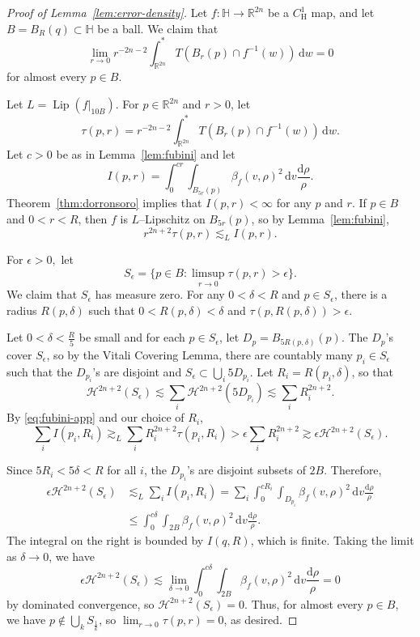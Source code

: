 \documentclass[12pt,reqno]{amsart}
\newcommand{\cH}{\mathcal{H}}
\DeclareMathOperator{\Lip}{Lip}
\newcommand{\HH}{\mathbb{H}}
\newcommand{\R}{\mathbb{R}}
\newcommand{\ud}[0]{\,\mathrm{d}}
\newcommand{\from}{\colon}
\theoremstyle{remark}
\newcommand{\0}{\mathbf{0}}
\renewcommand{\1}{\mathbf 1}
\begin{document}
\begin{proof}[Proof of Lemma~\ref{lem:error-density}]
  Let $f\from \HH \to \R^{2n}$ be a $C^1_{\mathrm{H}}$ map, and let $B=B_R(q) \subset \HH$ be a ball. We claim that
  \begin{equation}\label{eq:error-density-conclusion}
    \lim_{r\to 0} r^{-2n-2}\int^*_{\R^{2n}} T(B_r(p) \cap f^{-1}(w)) \ud w = 0
  \end{equation}
  for almost every $p \in B$.

  Let $L = \Lip(f|_{10B})$. 
  For $p\in \R^{2n}$ and $r>0$, let
  $$\tau(p, r) = r^{-2n-2}\int^*_{\R^{2n}} T(B_r(p) \cap f^{-1}(w)) \ud w.$$
  Let $c>0$ be as in Lemma~\ref{lem:fubini} and let 
  $$I(p,r) = \int_0^{cr} \int_{B_{5r}(p)}\beta_f(v, \rho)^2 \ud v \frac{\mathrm d\rho}{\rho}.$$
  Theorem~\ref{thm:dorronsoro} implies that $I(p,r) < \infty$ for any $p$ and $r$. If $p\in B$ and $0<r<R$, then $f$ is $L$--Lipschitz on $B_{5r}(p)$, so by Lemma~\ref{lem:fubini},
  \begin{equation}\label{eq:fubini-app}
    r^{2n+2} \tau(p,r) \lesssim_L I(p,r).
  \end{equation}
  
  For $\epsilon > 0,$ let
  $$S_\epsilon = \{p \in B : \limsup_{r\to 0} \tau(p,r) > \epsilon\}.$$
  We claim that $S_\epsilon$ has measure zero. For any $0 < \delta < R$ and $p\in S_\epsilon$, there is a radius $R(p,\delta)$ such that $0 < R(p,\delta) < \delta$ and $\tau(p, R(p,\delta)) > \epsilon$.

  Let $0 < \delta < \frac{R}{5}$ be small and for each $p\in S_\epsilon$, let $D_p = B_{5 R(p,\delta)}(p)$. The $D_p$'s cover $S_\epsilon$, so by the Vitali Covering Lemma, there are countably many $p_i\in S_\epsilon$ such that the $D_{p_i}$'s are disjoint and $S_\epsilon \subset \bigcup_i 5D_{p_i}$. 
  Let $R_i =  R(p_i,\delta)$, so that
  $$\cH^{2n+2}(S_\epsilon)\lesssim \sum_i \cH^{2n+2}(5D_{p_i}) \lesssim \sum_i R_i^{2n+2}.$$
  By \eqref{eq:fubini-app} and our choice of $R_i$,
  $$\sum_i I(p_i,R_i) \gtrsim_L \sum_i R_i^{2n+2} \tau(p_i,R_i) > \epsilon \sum_i R_i^{2n+2} \gtrsim \epsilon \cH^{2n+2}(S_\epsilon).$$
  
  Since $5R_i < 5 \delta < R$ for all $i$, the $D_{p_i}$'s are disjoint subsets of $2B$. Therefore,
  \[
  \begin{aligned}
  \epsilon \cH^{2n+2}(S_\epsilon)&\lesssim_L \sum_i I(p_i,R_i) = \sum_i \int_0^{cR_i} \int_{D_{p_i}}\beta_f(v, \rho)^2 \ud v \frac{\mathrm d\rho}{\rho} \\
  &\le \int_0^{c\delta} \int_{2B}\beta_f(v, \rho)^2 \ud v \frac{\mathrm d\rho}{\rho}.
  \end{aligned}
  \]
  The integral on the right is bounded by $I(q,R)$, which is finite.
  Taking the limit as $\delta \to 0$, we have
  $$\epsilon \cH^{2n+2}(S_\epsilon)\lesssim \lim_{\delta \to 0} \int_0^{c\delta} \int_{2B}\beta_f(v, \rho)^2 \ud v \frac{\mathrm d\rho}{\rho} = 0$$
  by dominated convergence, so $\cH^{2n+2}(S_\epsilon)=0$. Thus, for almost every $p\in B$, we have $p\not \in \bigcup_{k} S_{\frac{1}{k}}$, so $\lim_{r\to 0} \tau(p,r) = 0$, as desired. 
\end{proof}
\end{document}
